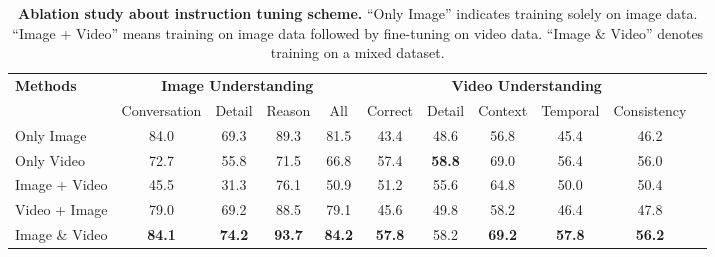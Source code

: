 \documentclass[10pt,twocolumn,letterpaper]{article}
\begin{document}
\begin{table*}[t]
\footnotesize
\setlength{\tabcolsep}{10.6pt}
{
\centering
\begin{tabular}{lcccccccccc}
\toprule[.9pt]
\multirow{2}{*}{\textbf{Methods}} & \multicolumn{4}{c}{\textbf{Image Understanding}}  & \multicolumn{5}{c}{\textbf{Video Understanding}} \\
\cmidrule(rl){2-5} \cmidrule(rl){6-10}
& {Conversation} & {Detail} & {Reason} & {All} & {Correct} & {Detail} & {Context} & {Temporal} & {{Consistency}} 
 \\ \midrule
 Only Image & 84.0 & 69.3 & 89.3 & 81.5 & 43.4 & 48.6 & 56.8 & 45.4 & 46.2 \\
 Only Video & 72.7 & 55.8 & 71.5 & 66.8 & 57.4 & \bf{58.8} & 69.0 & 56.4 & 56.0 \\
 Image + Video & 45.5 & 31.3 & 76.1 & 50.9 & 51.2 & 55.6 & 64.8 & 50.0 & 50.4 \\
 Video + Image & 79.0 & 69.2 & 88.5 & 79.1 & 45.6 & 49.8 & 58.2 & 46.4 & 47.8 \\ \midrule
 \rowcolor{aliceblue!60} Image \& Video & \bf{84.1} & \bf{74.2} & \bf{93.7} & \bf{84.2} & \bf{57.8} & 58.2 & \bf{69.2} & \bf{57.8} & \bf{56.2} \\
\bottomrule[.9pt]
\end{tabular}
\vspace{-.6em}
\caption{\textbf{Ablation study about instruction tuning scheme.} ``Only Image'' indicates training solely on image data. ``Image + Video'' means training on image data followed by fine-tuning on video data. ``Image \& Video'' denotes training on a mixed dataset.}
\label{tab:ab_tuning}
}
\vspace{1.em}



\end{table*}
\end{document}
